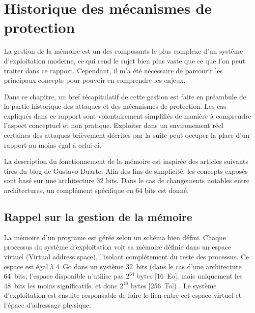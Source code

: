 \chapter{Historique des mécanismes de protection}
\label{chap:historique}

La gestion de la mémoire est un des composants le plus complexe d'un système d'exploitation moderne, ce qui rend le sujet bien plus vaste que ce que l'on peut traiter dans ce rapport. Cependant, il m'a été nécessaire de parcourir les principaux concepts pour pouvoir en comprendre les enjeux.

Dans ce chapitre, un bref récapitulatif de cette gestion est faite en préambule de la partie historique des attaques et des mécanismes de protection. Les cas expliqués dans ce rapport sont volontairement simplifiés de manière à comprendre l'aspect conceptuel et non pratique. Exploiter dans un environement réel certaines des attaques brièvement décrites par la suite peut occuper la place d'un rapport au moins égal à celui-ci.

La description du fonctionnement de la mémoire est inspirée des articles suivants \cite{AnatomyOfAProgramInMemory} \cite{HowTheKernelManagesYourMemory} \cite{JourneyToTheStackPartI} tirés du blog de Gustavo Duarte. Afin des fins de simplicité, les concepts exposés sont basé sur une architecture 32 bits. Dans le cas de changements notables entre architectures, un complément spécifique en 64 bits est donné.

\minitoc

\newpage

\section{Rappel sur la gestion de la mémoire}

La mémoire d'un programe est gérée selon un schéma bien défini. Chaque processus du système d'exploitation voit sa mémoire définie dans un espace virtuel (Virtual address space), l'isolant complétement du reste des processus. Ce espace est égal à 4~Go dans un système 32~bits (dans le cas d'une architecture 64~bits, l'espace disponible n'utilise pas $2^{64}$ bytes [16~Eo], mais uniquement les 48~bits les moins significatifs, et donc $2^{48}$ bytes [256~To]) \cite{64bitComputing} \cite{VirtualAddressSpaceDetails}. Le système d'exploitation est ensuite responsable de faire le lien entre cet espace virtuel et l'épace d'adressage physique.

